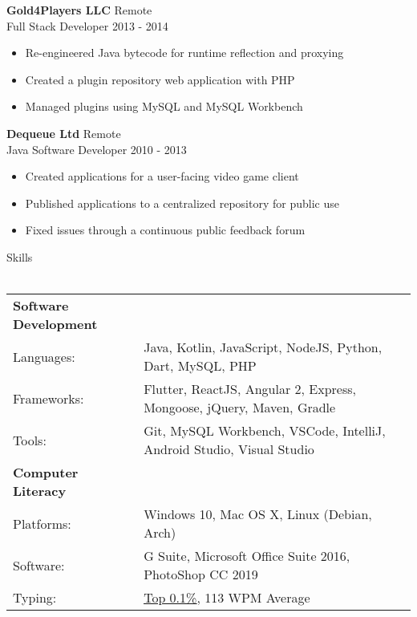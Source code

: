 \documentclass[a4paper]{article}
\newcommand{\lineunder} {
    \vspace*{-8pt} \\
    \hspace*{-18pt} \hrulefill \\
}
\newcommand{\header} [1] {
    {\hspace*{-18pt}\vspace*{6pt} {#1}}
    \vspace*{-6pt} \lineunder
}
\newcommand{\subheader} [1] {
    \hspace{2pt}
    \textbf{
        {\hspace*{-18pt}\vspace*{6pt} {#1}}
        \vspace*{-6pt}
    }
    \\
}
\begin{document}
\textbf{Gold4Players LLC} \hfill Remote\\
Full Stack Developer \hfill 2013 - 2014\\
\vspace{-3mm}
\begin{itemize} \itemsep 1pt
	\item Re-engineered Java bytecode for runtime reflection and proxying
	\vspace{-1mm}
	\item Created a plugin repository web application with PHP
	\vspace{-1mm}
	\item Managed plugins using MySQL and MySQL Workbench
\end{itemize}

\vspace{-2mm}

\textbf{Dequeue Ltd} \hfill Remote\\
Java Software Developer \hfill 2010 - 2013\\
\vspace{-2.5mm}
\begin{itemize} \itemsep 1pt
    \item Created applications for a user-facing video game client
    \vspace{-1mm}
	\item Published applications to a centralized repository for public use
	\vspace{-1mm}
	\item Fixed issues through a continuous public feedback forum
\end{itemize}

\header{Skills}
\vspace{2mm}
\begin{tabular}{ l l }
    \subheader{Software Development}
    \hspace{-3mm}
	Languages:      & Java, Kotlin, JavaScript, NodeJS, Python, Dart, MySQL, PHP    \\
    \hspace{-3mm}
	Frameworks:     & Flutter, ReactJS, Angular 2, Express, Mongoose, jQuery, Maven, Gradle \\
    \hspace{-3mm}
	Tools:          & Git, MySQL Workbench, VSCode, IntelliJ, Android Studio, Visual Studio
	\vspace{1mm}\\
    \subheader{Computer Literacy}
    \hspace{-3mm}
	Platforms:  & Windows 10, Mac OS X, Linux (Debian, Arch) \\
    \hspace{-3mm}
	Software:   & G Suite, Microsoft Office Suite 2016, PhotoShop CC 2019  \\
    \hspace{-3mm}
	Typing:     & \href{https://data.typeracer.com/misc/badge?user=tsedlar}{\ul{Top 0.1\%}}, 113 WPM Average \\
\end{tabular}
\vspace*{2mm}
\end{document}
